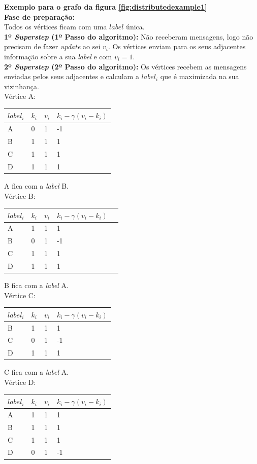 \documentclass[a4paper,10pt]{report}
\begin{document}
{\bf Exemplo para o grafo da figura \ref{fig:distributedexample1}}
\\[0.25cm]
{\bf Fase de preparação:}\\
Todos os vértices ficam com uma $label$ única. 
\\[0.25cm]
{\bf 1º \textit{Superstep} (1º Passo do algoritmo):}
Não receberam mensagens, logo não precisam de fazer \textit{update} ao sei 
$v_i$.
Os vértices enviam para os seus adjacentes 
informação sobre a sua \textit{label} e com $v_i=1$.
\\[0.25cm]
{\bf 2º \textit{Superstep} (2º Passo do algoritmo):}
Os vértices recebem as mensagens enviadas pelos seus adjacentes e calculam a 
$label_i$ que é maximizada na sua vizinhança.
\\[0.25cm]
Vértice A:
  \begin{tabular}{| l | l | l | l |}
  \hline
  $label_i$ & $k_i$ & $v_i$ & $k_i - \gamma(v_i - k_i)$\\ \hline
  A & 0 & 1 & -1 \\ \hline
  B & 1 & 1 & 1  \\ \hline
  C & 1 & 1 & 1  \\ \hline
  D & 1 & 1 & 1  \\ \hline
  \end{tabular}
  A fica com a \textit{label} B.
\\[0.25cm]
Vértice B:
  \begin{tabular}{| l | l | l | l | l |}
  \hline
  $label_i$ & $k_i$ & $v_i$ & $k_i - \gamma(v_i - k_i)$\\ \hline
  A & 1 & 1 & 1  \\ \hline
  B & 0 & 1 & -1 \\ \hline
  C & 1 & 1 & 1  \\ \hline
  D & 1 & 1 & 1  \\ \hline
  \end{tabular}
  B fica com a \textit{label} A.
\\[0.25cm]
Vértice C:
  \begin{tabular}{| l | l | l | l |}
  \hline
  $label_i$ & $k_i$ & $v_i$ & $k_i - \gamma(v_i - k_i)$\\ \hline
  B & 1 & 1 & 1 \\ \hline
  C & 0 & 1 & -1 \\ \hline
  D & 1 & 1 & 1 \\ \hline
  \end{tabular}
  C fica com a \textit{label} A.
\\[0.25cm]
Vértice D:
  \begin{tabular}{| l | l | l | l |}
  \hline
  $label_i$ & $k_i$ & $v_i$ & $k_i - \gamma(v_i - k_i)$\\ \hline
  A & 1 & 1 & 1  \\ \hline
  B & 1 & 1 & 1  \\ \hline
  C & 1 & 1 & 1  \\ \hline
  D & 0 & 1 & -1 \\ \hline
  \end{tabular}  
\end{document}
